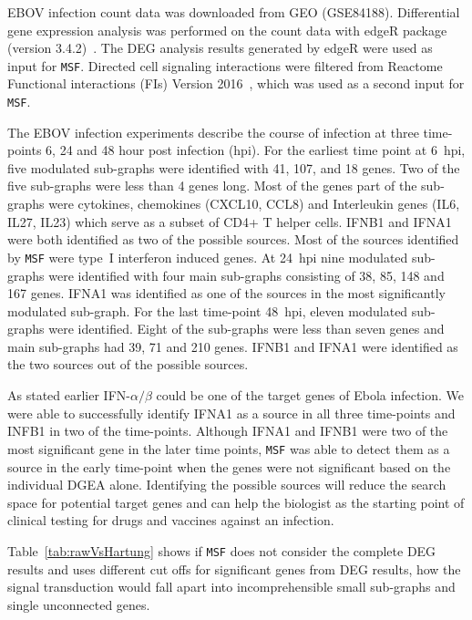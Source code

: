 \documentclass[10pt,a4paper,twocolumn]{article}
\begin{document}
EBOV infection count data was downloaded from GEO (GSE84188). Differential gene
expression analysis was performed on the count data with edgeR package
(version 3.4.2)~\cite{edgeR}. The DEG analysis results generated by
edgeR were used as input for \texttt{MSF}. Directed cell signaling interactions were filtered from
Reactome Functional interactions (FIs) Version 2016~\cite{Cytokegg}, which was used as a second input for \texttt{MSF}.


The EBOV infection
experiments describe the course of infection at three time-points 6,
24 and 48 hour post infection (hpi). For the earliest time point at
6~hpi, five modulated sub-graphs were identified with 41, 107, and 18
genes. Two of the five sub-graphs were less than 4 genes long. Most of
the genes part of the sub-graphs were cytokines, chemokines (CXCL10,
CCL8) and Interleukin genes (IL6, IL27, IL23) which serve as a subset
of CD4+ T helper cells. IFNB1 and IFNA1 were both identified as two of
the possible sources. Most of the sources identified by \texttt{MSF}
were type~I interferon induced genes. At 24~hpi nine modulated
sub-graphs were identified with four main sub-graphs consisting of 38,
85, 148 and 167 genes. IFNA1 was identified as one of the sources in
the most significantly modulated sub-graph. For the last time-point
48~hpi, eleven modulated sub-graphs were identified. Eight of the
sub-graphs were less than seven genes and main sub-graphs had 39, 71
and 210 genes. IFNB1 and IFNA1 were identified as the two sources out
of the possible sources. 

As stated earlier IFN-$\alpha / \beta$ could be one of the target
genes of Ebola infection. We were able to successfully identify IFNA1
as a source in all three time-points and INFB1 in two of the
time-points. Although IFNA1 and IFNB1 were two of the most significant
gene in the later time points, \texttt{MSF} was able to detect them as
a source in the early time-point when the genes were not significant
based on the individual DGEA alone. Identifying the possible sources
will reduce the search space for potential target genes and can help
the biologist as the starting point of clinical testing for drugs and
vaccines against an infection.

Table~\ref{tab:rawVsHartung} shows if \texttt{MSF} does not
consider the complete DEG results and uses different cut offs for
significant genes from DEG results, how the signal transduction would
fall apart into incomprehensible small sub-graphs and single unconnected
genes.
\end{document}
